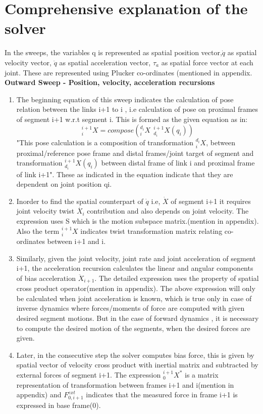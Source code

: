 \section{Comprehensive explanation of the solver}
In the sweeps, the variables q is represented as spatial position vector,$\dot{q}$ as spatial velocity vector, $\ddot{q}$ as spatial acceleration vector, $\tau_{a}$ as spatial force vector at each joint. These are represented using Plucker co-ordinates (mentioned in appendix\cite{shakhimardanov2015}.\\
\newpage
\textbf{Outward Sweep - Position, velocity, acceleration recursions}
\begin{enumerate}
	\item The beginning equation of this sweep indicates the calculation of pose relation between the links i+1 to i , i.e calculation of pose on proximal frames of segment i+1 w.r.t segment i. This is formed as the given equation as in\cite{shakhimardanov2015}:
	$$ {}^{i+1}_{i}X = compose({}^{d_i}_{i}X \ \  {}^{i+1}_{d_i}X(q_i))$$ 
	"This pose calculation is a composition of transformation ${}^{d_i}_{i}X$, between proximal/reference pose frame and distal frames/joint target of segment and transformation ${}^{i+1}_{d_i}X(q_i)$ between distal frame of link {i} and proximal frame of link {i+1}". These as indicated in the equation indicate that they are dependent on joint position qi.\cite{shakhimardanov2015}
	\item Inorder to find the spatial counterpart of $\dot{q}$ i.e, $\dot{X}$ of segment i+1 it requires joint velocity twist $\dot{X_{i}}$ contribution and also depends on joint velocity. The expression uses S which is the motion subspace matrix.(mention in appendix). Also the term ${}^{i+1}_{i}X$ indicates twist transformation matrix relating co-ordinates between i+1 and i.
	\item Similarly, given the joint velocity, joint rate and joint acceleration of segment {i+1}, the acceleration recursion calculates  the linear and angular components of bias acceleration $\ddot{X}_{i+1}$. The detailed expression uses the property of spatial cross product operator(mention in appendix). The above expression will only be calculated when joint acceleration is known, which is true only in case of inverse dynamics where forces/moments of force are computed with given desired segment motions. But in the case of forward dynamics , it is necessary to compute the desired motion of the segments, when the desired forces are given.\cite{shakhimardanov2015}
	\item Later, in the consecutive step the solver computes bias force, this is given by spatial vector of velocity cross product with inertial matrix and subtracted by external forces of segment i+1. The expression ${}^{i+1}_{0}X^*$ is a matrix representation of transformation between frames i+1 and i(mention in appendix) and $F^{ext}_{0,i+1}$ indicates that the measured force in frame i+1 is expressed in base frame(0).
%		
\end{enumerate}
